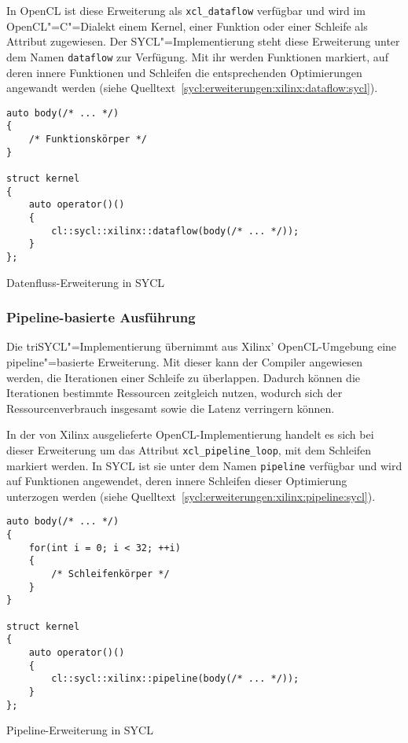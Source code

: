 In OpenCL ist diese Erweiterung als \texttt{xcl\_dataflow} verfügbar und wird
im OpenCL"=C"=Dialekt einem Kernel, einer Funktion oder einer Schleife als
Attribut zugewiesen. Der SYCL"=Implementierung steht diese Erweiterung unter dem
Namen \texttt{dataflow} zur Verfügung. Mit ihr werden Funktionen markiert, auf
deren innere Funktionen und Schleifen die entsprechenden Optimierungen angewandt
werden (siehe Quelltext~\ref{sycl:erweiterungen:xilinx:dataflow:sycl}).

\begin{code}
    \begin{verbatim}
auto body(/* ... */)
{
    /* Funktionskörper */
}

struct kernel
{
    auto operator()()
    {
        cl::sycl::xilinx::dataflow(body(/* ... */));
    }
};
    \end{verbatim}
    \caption{Datenfluss-Erweiterung in SYCL}
    \label{sycl:erweiterungen:xilinx:dataflow:sycl}
\end{code}

\subsubsection{Pipeline-basierte Ausführung}
\label{sycl:erweiterungen:xilinx:pipeline}

Die triSYCL"=Implementierung übernimmt aus Xilinx' OpenCL-Umgebung eine
pipeline"=basierte Erweiterung. Mit dieser kann der Compiler angewiesen werden,
die Iterationen einer Schleife zu überlappen. Dadurch können die Iterationen
bestimmte Ressourcen zeitgleich nutzen, wodurch sich der Ressourcenverbrauch
insgesamt sowie die Latenz verringern können.
\cite[siehe][67\psqq]{sdaccelopt2019}

In der von Xilinx ausgelieferte OpenCL-Implementierung handelt es sich bei
dieser Erweiterung um das Attribut \texttt{xcl\_pipeline\_loop}, mit dem
Schleifen markiert werden. In SYCL ist sie unter dem Namen \texttt{pipeline}
verfügbar und wird auf Funktionen angewendet, deren innere Schleifen dieser
Optimierung unterzogen werden (siehe
Quelltext~\ref{sycl:erweiterungen:xilinx:pipeline:sycl}).

\begin{code}
    \begin{verbatim}
auto body(/* ... */)
{
    for(int i = 0; i < 32; ++i)
    {
        /* Schleifenkörper */
    }
}

struct kernel
{
    auto operator()()
    {
        cl::sycl::xilinx::pipeline(body(/* ... */));
    }
};
    \end{verbatim}
    \caption{Pipeline-Erweiterung in SYCL}
    \label{sycl:erweiterungen:xilinx:pipeline:sycl}
\end{code}

